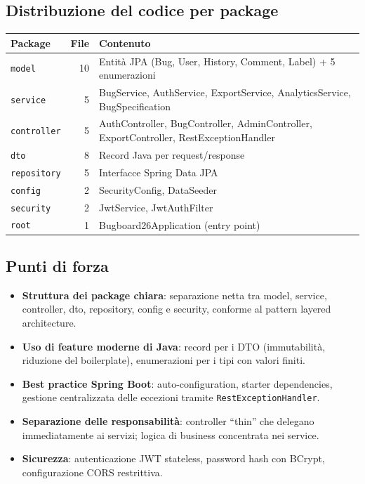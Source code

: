 \subsection{Distribuzione del codice per package}

\begin{center}
\small
\begin{tabular}{|l|r|p{7cm}|}
\hline
\textbf{Package} & \textbf{File} & \textbf{Contenuto} \\
\hline
\texttt{model} & 10 & Entità JPA (Bug, User, History, Comment, Label) + 5 enumerazioni \\
\hline
\texttt{service} & 5 & BugService, AuthService, ExportService, AnalyticsService, BugSpecification \\
\hline
\texttt{controller} & 5 & AuthController, BugController, AdminController, ExportController, RestExceptionHandler \\
\hline
\texttt{dto} & 8 & Record Java per request/response \\
\hline
\texttt{repository} & 5 & Interfacce Spring Data JPA \\
\hline
\texttt{config} & 2 & SecurityConfig, DataSeeder \\
\hline
\texttt{security} & 2 & JwtService, JwtAuthFilter \\
\hline
\texttt{root} & 1 & Bugboard26Application (entry point) \\
\hline
\end{tabular}
\end{center}

\subsection{Punti di forza}

\begin{itemize}
    \item \textbf{Struttura dei package chiara}: separazione netta tra model,
    service, controller, dto, repository, config e security, conforme al pattern
    layered architecture.
    \item \textbf{Uso di feature moderne di Java}: record per i DTO (immutabilità,
    riduzione del boilerplate), enumerazioni per i tipi con valori finiti.
    \item \textbf{Best practice Spring Boot}: auto-configuration, starter
    dependencies, gestione centralizzata delle eccezioni tramite
    \texttt{RestExceptionHandler}.
    \item \textbf{Separazione delle responsabilità}: controller ``thin'' che
    delegano immediatamente ai servizi; logica di business concentrata nei
    service.
    \item \textbf{Sicurezza}: autenticazione JWT stateless, password hash con
    BCrypt, configurazione CORS restrittiva.
\end{itemize}

